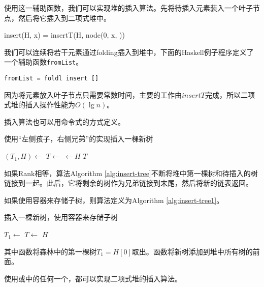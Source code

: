 \documentclass{ctexart}
\begin{document}
使用这一辅助函数，我们可以实现堆的插入算法。先将待插入元素装入一个叶子节点，然后将它插入到二项式堆中。

\be
insert(H, x) = insertT(H, node(0, x, \phi))
\ee

我们可以连续将若干元素通过folding插入到堆中，下面的Haskell例子程序定义了一个辅助函数\texttt{fromList}。

\begin{lstlisting}[style=Haskell]
fromList = foldl insert []
\end{lstlisting}

因为将元素放入叶子节点只需要常数时间，主要的工作由$insertT$完成，所以二项式堆的插入操作性能为$O(\lg n)$。

插入算法也可以用命令式的方式定义。

\begin{algorithm}
\caption{使用“左侧孩子，右侧兄弟”的实现插入一棵新树}
\label{alg:insert-tree}
\begin{algorithmic}[1]
    \State $(T_1, H) \gets$ 
    \State $T \gets $ 
  \EndWhile
  \State {} $\gets H$
  \State \Return $T$
\EndFunction
\end{algorithmic}
\end{algorithm}

如果Rank相等，算法Algorithm \ref{alg:insert-tree}不断将堆中第一棵树和待插入的树链接到一起。此后，它将剩余的树作为兄弟链接到末尾，然后将新的链表返回。

如果使用容器来存储子树，则算法定义为Algorithm \ref{alg:insert-tree1}。

\begin{algorithm}
\caption{插入一棵新树，使用容器来存储子树}
\label{alg:insert-tree1}
\begin{algorithmic}[1]
    \State $T_1 \gets$ 
    \State $T \gets $ 
  \EndWhile
  \State {}
  \State \Return $H$
\EndFunction
\end{algorithmic}
\end{algorithm}

其中函数将森林中的第一棵树$T_1 = H[0]$取出。函数将新树添加到堆中所有树的前面。

使用或中的任何一个，都可以实现二项式堆的插入算法。
\end{document}
